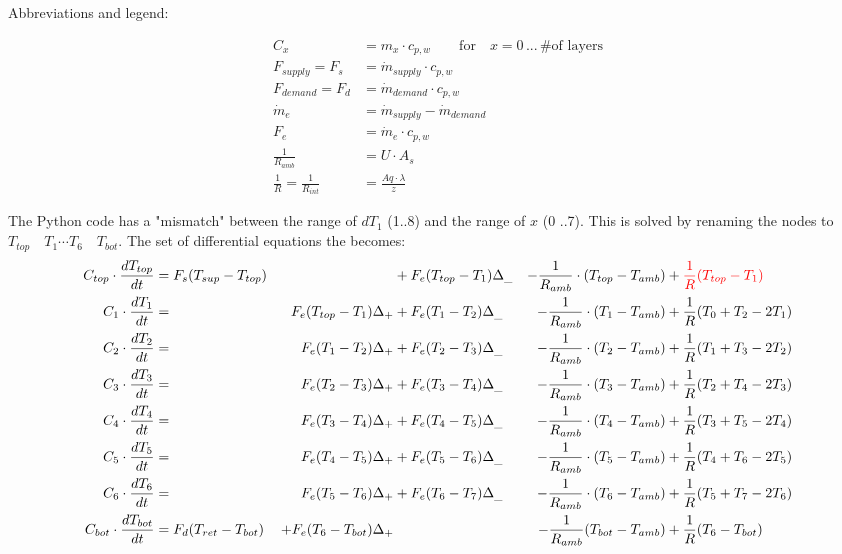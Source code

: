 Abbreviations and legend:
\begin{scriptsize}
	\begin{equation}
		\begin{aligned}
			C_x &= m_x \cdot c_{p, w} \qquad \text{for} \quad x =  0 \, \text{...} \, \text{\# of layers}\\
			F_{supply} = F_s &= \dot{m}_{supply} \cdot c_{p, w} \\
			F_{demand} = F_d &= \dot{m}_{demand} \cdot c_{p, w} \\
			\dot{m}_e &= \dot{m}_{supply} - \dot{m}_{demand} \\
			F_e &= \dot{m}_{e} \cdot c_{p, w} \\
			\frac{1}{R_{amb}} &= U \cdot A_s \\
			\frac{1}{R} = \frac{1}{R_{int}} &= \frac{Aq \cdot \lambda}{z}
		\end{aligned}
	\end{equation}
	
	The Python code has a "mismatch" between the range of $dT_1$ (1..8) and the range of $x$ (0 ..7). This is solved by renaming the nodes to $T_{top} \quad T_1 \cdots T_6 \quad T_{bot}$. The set of differential equations the becomes:
	\begin{equation}
		\begin{aligned}
			C_{top} \cdot \frac{dT_{top}}{dt} &= F_s (T_{sup} - T_{top}) &&+ F_e (T_{top} - T_1) \Delta_{\_} &- \frac{1}{R_{amb}} \cdot (T_{top} - T_{amb}) &+ {\color{red}\frac{1}{R} (T_{top} - T_1)} \\
			C_1 \cdot \frac{dT_1}{dt} &= &F_e (T_{top} - T_1) \Delta_{+} &+ F_e (T_1 - T_2) \Delta_{\_} &- \frac{1}{R_{amb}} \cdot (T_1 - T_{amb}) &+ \frac{1}{R} (T_0 + T_2 - 2 T_1) \\
			C_2 \cdot \frac{dT_2}{dt} &= &F_e (T_1 - T_2) \Delta_{+} &+ F_e (T_2 - T_3) \Delta_{\_} &- \frac{1}{R_{amb}} \cdot (T_2 - T_{amb}) &+ \frac{1}{R} (T_1 + T_3 - 2 T_2) \\
			C_3 \cdot \frac{dT_3}{dt} &= &F_e (T_2 - T_3) \Delta_{+} &+ F_e (T_3 - T_4) \Delta_{\_} &- \frac{1}{R_{amb}} \cdot (T_3 - T_{amb}) &+ \frac{1}{R} (T_2 + T_4 - 2 T_3) \\
			C_4 \cdot \frac{dT_4}{dt} &= &F_e (T_3 - T_4) \Delta_{+} &+ F_e (T_4 - T_5) \Delta_{\_} &- \frac{1}{R_{amb}} \cdot (T_4 - T_{amb}) &+ \frac{1}{R} (T_3 + T_5 - 2 T_4) \\
			C_5 \cdot \frac{dT_5}{dt} &= &F_e (T_4 - T_5) \Delta_{+} &+ F_e (T_5 - T_6) \Delta_{\_} &- \frac{1}{R_{amb}} \cdot (T_5 - T_{amb}) &+ \frac{1}{R} (T_4 + T_6 - 2 T_5) \\
			C_6 \cdot \frac{dT_6}{dt} &= &F_e (T_5 - T_6) \Delta_{+} &+ F_e (T_6 - T_7) \Delta_{\_} &- \frac{1}{R_{amb}} \cdot (T_6 - T_{amb}) &+ \frac{1}{R} (T_5 + T_7 - 2 T_6) \\
			C_{bot} \cdot \frac{dT_{bot}}{dt} &= F_d (T_{ret} - T_{bot}) &+ F_e (T_6 - T_{bot}) \Delta_{+} &&- \frac{1}{R_{amb}} (T_{bot} - T_{amb}) &+ \frac{1}{R} (T_6 - T_{bot}) \\
		\end{aligned}
	\end{equation}
	

\end{scriptsize}

